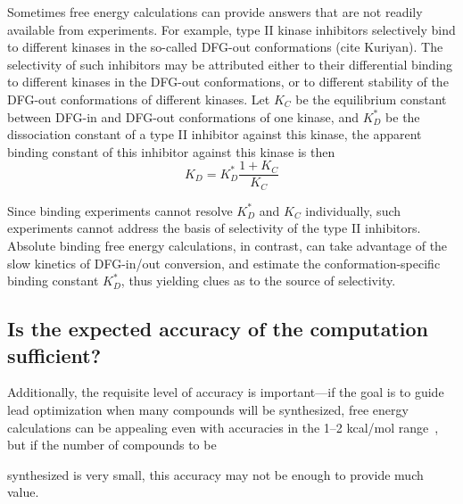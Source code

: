 \documentclass[9pt,bestpractices]{livecoms}
\begin{document}
Sometimes free energy calculations can provide answers that are not
readily available from experiments.  For example, type II kinase
inhibitors selectively bind to different kinases in the so-called
DFG-out conformations (cite Kuriyan).  The selectivity of such
inhibitors may be attributed either to their differential binding to
different kinases in the DFG-out conformations, or to different
stability of the DFG-out conformations of different kinases.  Let
$K_C$ be the equilibrium constant between DFG-in and DFG-out
conformations of one kinase, and $K_D^\ast$ be the dissociation
constant of a type II inhibitor against this kinase, the apparent
binding constant of this inhibitor against this kinase is then
\begin{equation}
  K_D = K_D^\ast \frac{1 + K_C}{K_C}
  \label{eqn:conformational-binding}
\end{equation}

Since binding experiments cannot resolve $K_D^\ast$ and $K_C$ individually, such experiments cannot address the basis of selectivity of the type II inhibitors.  Absolute binding free energy calculations, in contrast, can take advantage of the slow kinetics of DFG-in/out conversion, and estimate the conformation-specific binding constant $K_D^\ast$, thus yielding clues as to the source of selectivity.

\subsection*{Is the expected accuracy of the computation sufficient?}
Additionally, the requisite level of accuracy is important---if the
goal is to guide lead optimization when many compounds will be
synthesized, free energy calculations can be appealing even with
accuracies in the 1--2 kcal/mol range~\cite{mobley2012perspective}, but if the number of compounds to be

synthesized is very small, this accuracy may not be enough to provide
much value.
\end{document}

